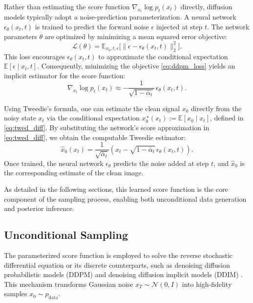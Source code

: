 \documentclass[a4paper,11pt]{article}
\renewcommand{\varepsilon}{\epsilon}
\theoremstyle{definition}
\theoremstyle{plain}
\theoremstyle{remark}
\begin{document}
Rather than estimating the score function $\nabla_{x_t}\log p_t(x_t)$ directly, diffusion models typically adopt a noise-prediction parameterization. A neural network $\varepsilon_\theta(x_t,t)$ is trained to predict the forward noise $\varepsilon$ injected at step $t$. The network parameters $\theta$ are optimized by minimizing a mean squared error objective:
\begin{equation}
    \label{eq:ddpm_loss}
    \mathcal{L}(\theta) = \mathbb{E}_{x_0,t,\varepsilon} \Big[ \big\| \varepsilon - \varepsilon_\theta(x_t,t) \big\|_2^2 \Big].
\end{equation}
This loss encourages $\varepsilon_\theta(x_t,t)$ to approximate the conditional expectation $\mathbb{E}[\varepsilon \mid x_t,t]$. Consequently, minimizing the objective \eqref{eq:ddpm_loss} yields an implicit estimator for the score function:
\begin{equation}
    \label{eq:scoreest}
    \nabla_{x_t}\log p_t(x_t) \approx -\frac{1}{\sqrt{1-\bar\alpha_t}}\, \varepsilon_\theta(x_t,t).
\end{equation}

Using Tweedie's formula, one can estimate the clean signal $x_0$ directly from the noisy state $x_t$ via the conditional expectation $x_0^{\,\star}(x_t) := 
\mathbb{E}[x_0 \mid x_t]$, defined in \eqref{eq:twed_diff}. By substituting the network's score approximation in \eqref{eq:twed_diff}, we obtain the computable Tweedie estimator:
\begin{equation}
\hat x_0(x_t)
=
\frac{1}{\sqrt{\bar\alpha_t}}
\left(
x_t - \sqrt{1-\bar\alpha_t}\,\varepsilon_\theta(x_t,t)
\right).
\label{eq:tweedie_estimator}
\end{equation}
Once trained, the neural network $\varepsilon_\theta$ predicts the noise added at step $t$, and $\hat{x}_0$ is the corresponding estimate of the clean image.

 As detailed in the following sections, this learned score function is the core component of the sampling process, enabling both unconditional data generation and posterior inference.

\subsection{Unconditional Sampling}
The parameterized score function is employed to solve the reverse stochastic differential equation or its discrete counterparts, such as denoising diffusion probabilistic models
 (DDPM) \cite{ho2020denoising} and denoising diffusion implicit models (DDIM) \cite{song2021denoising}. This mechanism transforms Gaussian noise $x_T \sim \mathcal{N}(0,I)$ into high-fidelity samples $x_0 \sim p_{\mathrm{data}}$.
\end{document}
